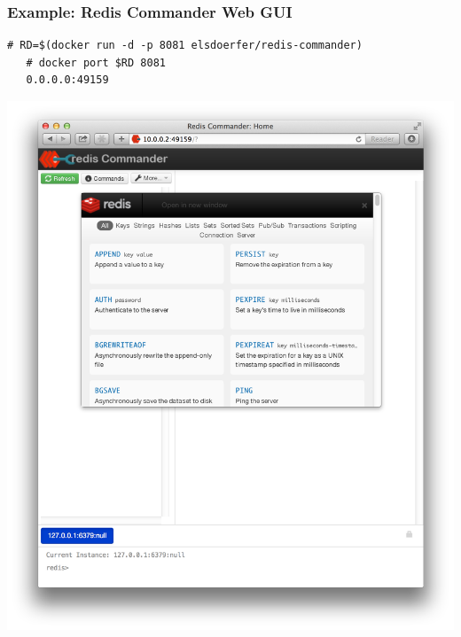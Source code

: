 \documentclass[xcolor=dvipsnames]{beamer}
\begin{document}
\begin{frame}[fragile]
  \frametitle{Example: Redis Commander Web GUI}
  \begin{lstlisting}[basicstyle=\tiny]
   # RD=$(docker run -d -p 8081 elsdoerfer/redis-commander)
   # docker port $RD 8081
   0.0.0.0:49159
  \end{lstlisting}
  \includegraphics[width=\textwidth]{figures/redis-commander.pdf}
\end{frame}
\end{document}
